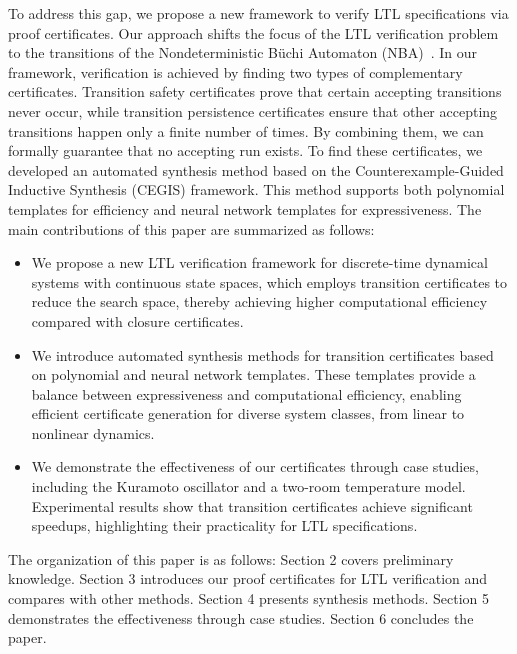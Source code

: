 To address this gap, we propose a new framework to verify LTL specifications via proof certificates. Our approach shifts the focus of the LTL verification problem to the transitions of the Nondeterministic Büchi Automaton (NBA)~\cite{hahn2020reward}. In our framework, verification is achieved by finding two types of complementary certificates. Transition safety certificates prove that certain accepting transitions never occur, while transition persistence certificates ensure that other accepting transitions happen only a finite number of times. By combining them, we can formally guarantee that no accepting run exists. To find these certificates, we developed an automated synthesis method based on the Counterexample-Guided Inductive Synthesis (CEGIS) framework. This method supports both polynomial templates for efficiency and neural network templates for expressiveness. The main contributions of this paper are summarized as follows:
\begin{itemize}

  \item We propose a new LTL verification framework for discrete-time dynamical systems with continuous state spaces, which employs transition certificates to reduce the search space, thereby achieving higher computational efficiency compared with closure certificates.
  

  \item We introduce automated synthesis methods for transition certificates based on polynomial and neural network templates. These templates provide a balance between expressiveness and computational efficiency, enabling efficient certificate generation for diverse system classes, from linear to nonlinear dynamics.
  

  \item We demonstrate the effectiveness of our certificates through case studies, including the Kuramoto oscillator and a two-room temperature model. Experimental results show that transition certificates achieve significant speedups, highlighting their practicality for LTL specifications.
\end{itemize}

The organization of this paper is as follows: Section 2 covers preliminary knowledge. Section 3 introduces our proof certificates for LTL verification and compares with other methods. Section 4 presents synthesis methods. Section 5 demonstrates the effectiveness through case studies. Section 6 concludes the paper.


